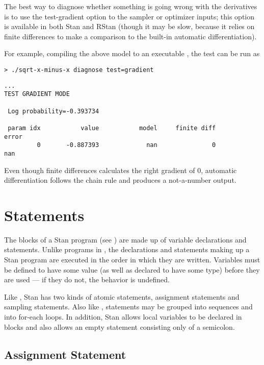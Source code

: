 The best way to diagnose whether something is going wrong with the
derivatives is to use the test-gradient option to the sampler or
optimizer inputs; this option is available in both Stan and RStan
(though it may be slow, because it relies on finite differences to
make a comparison to the built-in automatic differentiation).

For example, compiling the above model to an executable
, the test can be run as
%
\begin{Verbatim}[fontshape=sl,fontsize=\small]
> ./sqrt-x-minus-x diagnose test=gradient
\end{Verbatim}
\begin{Verbatim}[fontsize=\small]
...
TEST GRADIENT MODE

 Log probability=-0.393734

 param idx           value           model     finite diff           error
         0       -0.887393             nan               0             nan
\end{Verbatim}
%
Even though finite differences calculates the right gradient of 0,
automatic differentiation follows the chain rule and produces a
not-a-number output.



\chapter{Statements}

\noindent 
The blocks of a Stan program (see ) are made up of
variable declarations and statements.  Unlike programs in \BUGS, the
declarations and statements making up a Stan program are executed in
the order in which they are written.  Variables must be defined to
have some value (as well as declared to have some type) before they
are used --- if they do not, the behavior is undefined.

Like \BUGS, Stan has two kinds of atomic statements, assignment
statements and sampling statements.  Also like \BUGS, statements may
be grouped into sequences and into for-each loops.  In addition, Stan
allows local variables to be declared in blocks and also allows an
empty statement consisting only of a semicolon.

\section{Assignment Statement}

